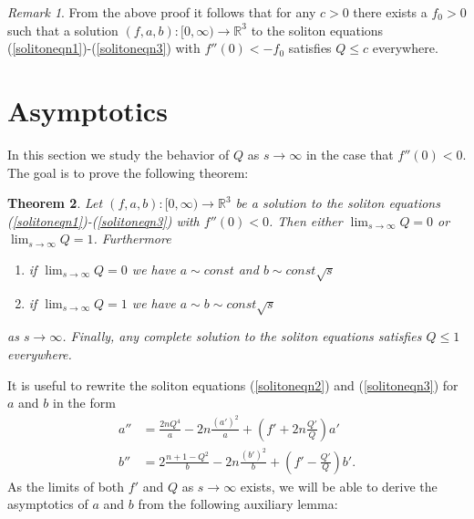 \documentclass{amsart}
\newtheorem{thm}{Theorem}[section]
\theoremstyle{definition}
\theoremstyle{remark}
\newtheorem{remark}[thm]{Remark}
\numberwithin{equation}{section}
\newcommand{\R}{\mathbb{R}}  %
\begin{document}
\begin{remark}
\label{rmk-collapsed}
From the above proof it follows that for any $c>0$ there exists a $f_0 >0$ such that a solution $(f,a,b): [0, \infty) \rightarrow \R^3$ to the soliton equations (\ref{solitoneqn1})-(\ref{solitoneqn3}) with $f''(0) < -f_0$ satisfies $Q \leq c$ everywhere.
\end{remark}

\section{Asymptotics}
In this section we study the behavior of $Q$ as $s\rightarrow \infty$ in the case that $f''(0) < 0$. The goal is to prove the following theorem:
\begin{thm}
\label{thm-asymptotics}
Let $(f,a,b): [0,\infty) \rightarrow \R^3$ be a solution to the soliton equations (\ref{solitoneqn1})-(\ref{solitoneqn3}) with $f''(0)<0$. Then either $\lim_{s\rightarrow\infty} Q = 0$ or $\lim_{s\rightarrow\infty} Q = 1$. Furthermore 
\begin{enumerate}
\item if $\lim_{s\rightarrow \infty} Q = 0$ we have $a \sim const$ and $b\sim const \sqrt{s}$
\item if $\lim_{s\rightarrow \infty} Q = 1$ we have $a \sim b\sim const \sqrt{s}$
\end{enumerate}
as $s \rightarrow \infty$. Finally, any complete solution to the soliton equations satisfies $Q\leq 1$ everywhere.
\end{thm}
It is useful to rewrite the soliton equations (\ref{solitoneqn2}) and (\ref{solitoneqn3}) for $a$ and $b$ in the form
\begin{align}
\label{aQ} a'' &= \frac{2nQ^4}{a} - 2n \frac{(a')^2}{a} + \left(f' +2n \frac{Q'}{Q} \right) a' \\
\label{bQ} b'' &= 2\frac{n+1-Q^2}{b} - 2n \frac{(b')^2}{b}  + \left(f'- \frac{Q'}{Q}\right) b'.
\end{align}
As the limits of both $f'$ and $Q$ as $s\rightarrow \infty$ exists, we will be able to derive the asymptotics of $a$ and $b$ from the following auxiliary lemma:
\end{document}
